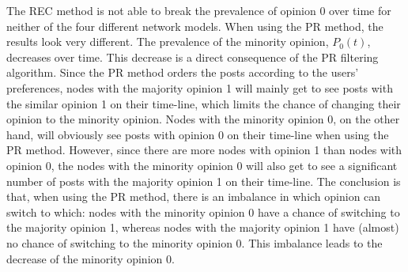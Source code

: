 \documentclass[11 pt , letterpaper , twoside , openright]{book}
\begin{document}
The REC method is not able to break the prevalence of opinion 0 over time for neither of the four different network models. When using the PR method, the results look very different. The prevalence of the minority opinion, $P_0(t)$, decreases over time. This decrease is a direct consequence of the PR filtering algorithm. Since the PR method orders the posts according to the users' preferences, nodes with the majority opinion 1 will mainly get to see posts with the similar opinion 1 on their time-line, which limits the chance of changing their opinion to the minority opinion. Nodes with the minority opinion 0, on the other hand, will obviously see posts with opinion 0 on their time-line when using the PR method. However, since there are more nodes with opinion 1 than nodes with opinion 0, the nodes with the minority opinion 0 will also get to see a significant number of posts with the majority opinion 1 on their time-line. The conclusion is that, when using the PR method, there is an imbalance in which opinion can switch to which: nodes with the minority opinion 0 have a chance of switching to the majority opinion 1, whereas nodes with the majority opinion 1 have (almost) no chance of switching to the minority opinion 0. This imbalance leads to the decrease of the minority opinion 0.\\
\newpage
\noindent
\end{document}
